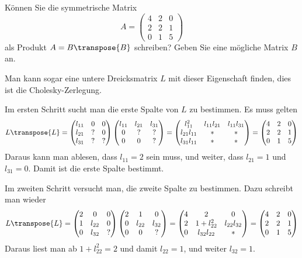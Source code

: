 Können Sie die symmetrische Matrix
\[
A
=
\begin{pmatrix}
4&2&0\\
2&2&1\\
0&1&5
\end{pmatrix}
\]
als Produkt $A=B\transpose{B}$ schreiben? Geben Sie eine mögliche
Matrix $B$ an.


\begin{loesung}
Man kann sogar eine untere Dreicksmatrix $L$ mit dieser Eigenschaft
finden, dies ist die Cholesky-Zerlegung.

Im ersten Schritt sucht man die erste Spalte von $L$ zu bestimmen.
Es muss gelten
\[
L\transpose{L}=
\begin{pmatrix}
l_{11}&  0&  0\\
l_{21}&  ?&  0\\
l_{31}&  ?&  ?
\end{pmatrix}
\begin{pmatrix}
l_{11}&l_{21}&l_{31}\\
     0&     ?&     ?\\
     0&     0&     ?
\end{pmatrix}
=
\begin{pmatrix}
    l_{11}^2&l_{11}l_{21}&l_{11}l_{31}\\
l_{21}l_{11}&           *&           *\\
l_{31}l_{11}&           *&           *
\end{pmatrix}
=
\begin{pmatrix}
4&2&0\\
2&2&1\\
0&1&5
\end{pmatrix}
\]
Daraus kann man ablesen, dass $l_{11}=2$ sein muss, und weiter,
dass
$l_{21}=1$ und $l_{31}=0$. Damit ist die erste Spalte bestimmt.

Im zweiten Schritt versucht man, die zweite Spalte zu bestimmen.
Dazu schreibt man wieder
\[
L\transpose{L}
=
\begin{pmatrix}
2&     0&0\\
1&l_{22}&0\\
0&l_{32}&?
\end{pmatrix}
\begin{pmatrix}
2&     1&     0\\
0&l_{22}&l_{32}\\
0&     0&?
\end{pmatrix}
=
\begin{pmatrix}
4&2           &           0\\
2&1+l_{22}^2  &l_{22}l_{32}\\
0&l_{32}l_{22}&         *
\end{pmatrix}
=
\begin{pmatrix}
4&2&0\\
2&2&1\\
0&1&5
\end{pmatrix}
\]
Daraus liest man ab $1+l_{22}^2=2$ und damit $l_{22}=1$, und weiter
$l_{32}=1$.


\end{loesung}
